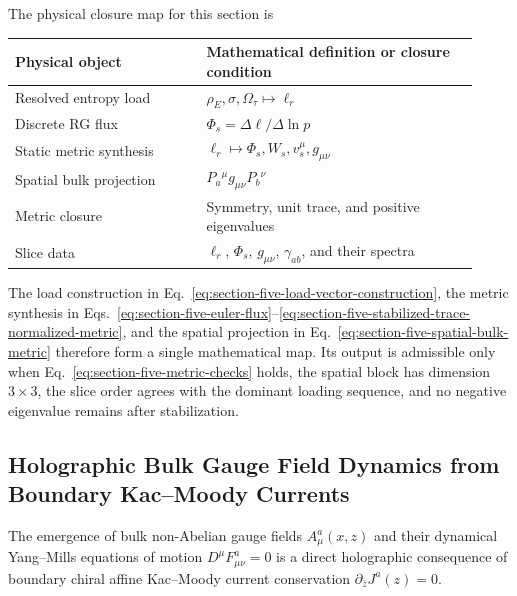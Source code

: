 \documentclass[11pt,letterpaper]{article}
\theoremstyle{plain}
\begin{document}
The physical closure map for this section is
\begin{center}
\small
\begin{tabular}{@{}L{0.38\linewidth}L{0.54\linewidth}@{}}
\toprule
Physical object & Mathematical definition or closure condition \\
\midrule
Resolved entropy load & $\rho_E,\sigma,\Omega_{\tau}\mapsto\ell_r$ \\
Discrete RG flux & $\Phi_s=\Delta\ell/\Delta\ln p$ \\
Static metric synthesis & $\ell_r\mapsto\Phi_s,W_s,v_s^{\mu},g_{\mu\nu}$ \\
Spatial bulk projection & $P_a{}^{\mu}g_{\mu\nu}P_b{}^{\nu}$ \\
Metric closure & Symmetry, unit trace, and positive eigenvalues \\
Slice data & $\ell_r$, $\Phi_s$, $g_{\mu\nu}$, $\gamma_{ab}$, and their spectra \\
\bottomrule
\end{tabular}
\end{center}
The load construction in Eq.~\eqref{eq:section-five-load-vector-construction},
the metric synthesis in
Eqs.~\eqref{eq:section-five-euler-flux}--\eqref{eq:section-five-stabilized-trace-normalized-metric},
and the spatial projection in Eq.~\eqref{eq:section-five-spatial-bulk-metric}
therefore form a single mathematical map.  Its output is admissible only when
Eq.~\eqref{eq:section-five-metric-checks} holds, the spatial block has dimension
$3\times3$, the slice order agrees with the dominant loading sequence, and no
negative eigenvalue remains after stabilization.

\subsection{Holographic Bulk Gauge Field Dynamics from Boundary Kac--Moody Currents}
\label{sec:bulk-gauge-dynamics-kac-moody}

The emergence of bulk non-Abelian gauge fields $A_\mu^a(x, z)$ and their dynamical Yang--Mills equations of motion $D^\mu F_{\mu\nu}^a = 0$ is a direct holographic consequence of boundary chiral affine Kac--Moody current conservation $\partial_{\bar{z}} J^a(z) = 0$.
\end{document}
